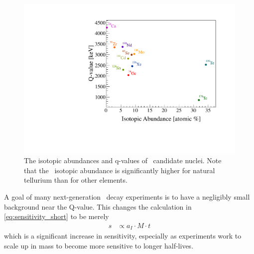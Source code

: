\begin{figure}[htbp]
    \centering
    \includegraphics[width=0.7\linewidth]{Figures/q_vs_ia-color.pdf}
    \caption[The isotopic abundances and q-values of \zeronubb~candidate nuclei]
    {The isotopic abundances and q-values of \zeronubb~candidate nuclei.
    Note that the \teonethirty~isotopic abundance is significantly higher for natural tellurium than for other elements.}
    \label{fig:q_vs_ia-color}
\end{figure}
A goal of many next-generation \zeronubb~decay experiments is to have a negligibly small background near the Q-value.
This changes the calculation in \autoref{eq:sensitivity_short} to be merely
\begin{align}
    s &\propto a_I \cdot M \cdot t
\end{align}
which is a significant increase in sensitivity, especially as experiments work to scale up in mass to become more sensitive to longer half-lives.
